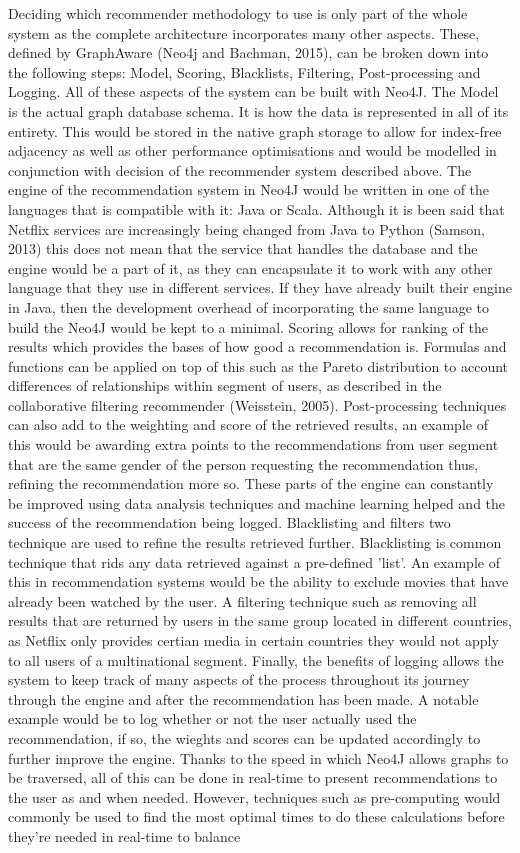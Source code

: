 \documentclass[a4paper]{article}
\begin{document}
Deciding which recommender methodology to use is only part of the whole system as the complete architecture incorporates many other aspects. These, defined by GraphAware (Neo4j and Bachman, 2015), can be broken down into the following steps: Model, Scoring, Blacklists, Filtering, Post-processing and Logging. All of these aspects of the system can be built with Neo4J. The Model is the actual graph database schema. It is how the data is represented in all of its entirety. This would be stored in the native graph storage to allow for index-free adjacency as well as other performance optimisations and would be modelled in conjunction with decision of the recommender system described above. The engine of the recommendation system in Neo4J would be written in one of the languages that is compatible with it: Java or Scala. Although it is been said that Netflix services are increasingly being changed from Java to Python (Samson, 2013) this does not mean that the service that handles the database and the engine would be a part of it, as they can encapsulate it to work with any other language that they use in different services. If they have already built their engine in Java, then the development overhead of incorporating the same language to build the Neo4J would be kept to a minimal. Scoring allows for ranking of the results which provides the bases of how good a recommendation is. Formulas and functions can be applied on top of this such as the Pareto distribution to account differences of relationships within segment of users, as described in the collaborative filtering recommender (Weisstein, 2005). Post-processing techniques can also add to the weighting and score of the retrieved results, an example of this would be awarding extra points to the recommendations from user segment that are the same gender of the person requesting the recommendation thus, refining the recommendation more so. These parts of the engine can constantly be improved using data analysis techniques and machine learning helped and the success of the recommendation being logged. Blacklisting and filters two technique are used to refine the results retrieved further. Blacklisting is common technique that rids any data retrieved against a pre-defined 'list'. An example of this in recommendation systems would be the ability to exclude movies that have already been watched by the user. A filtering technique such as removing all results that are returned by users in the same group located in different countries, as Netflix only provides certian media in certain countries they would not apply to all users of a multinational segment. Finally, the benefits of logging allows the system to keep track of many aspects of the process throughout its journey through the engine and after the recommendation has been made. A notable example would be to log whether or not the user actually used the recommendation, if so, the wieghts and scores can be updated accordingly to further improve the engine. Thanks to the speed in which Neo4J allows graphs to be traversed, all of this can be done in real-time to present recommendations to the user as and when needed. However, techniques such as pre-computing would commonly be used to find the most optimal times to do these calculations before they're needed in real-time to balance 
\end{document}
